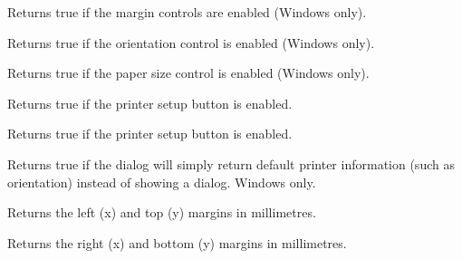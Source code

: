 Returns true if the margin controls are enabled (Windows only).

\label{wxpagesetupdialogdatagetenableorientation}


Returns true if the orientation control is enabled (Windows only).

\label{wxpagesetupdialogdatagetenablepaper}


Returns true if the paper size control is enabled (Windows only).

\label{wxpagesetupdialogdatagetenableprinter}


Returns true if the printer setup button is enabled.

\label{wxpagesetupdialogdatagetenablehelp}


Returns true if the printer setup button is enabled.

\label{wxpagesetupdialogdatagetdefaultinfo}


Returns true if the dialog will simply return default printer information (such as orientation)
instead of showing a dialog. Windows only.

\label{wxpagesetupdialogdatagetmargintopleft}


Returns the left (x) and top (y) margins in millimetres.

\label{wxpagesetupdialogdatagetmarginbottomright}


Returns the right (x) and bottom (y) margins in millimetres.

\label{wxpagesetupdialogdatagetminmargintopleft}

